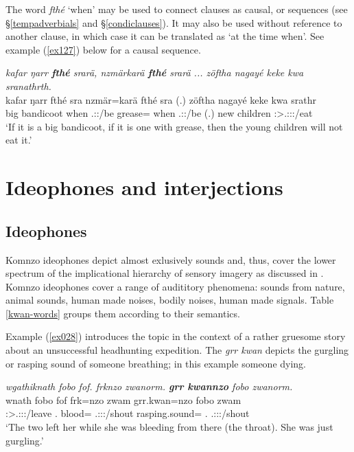 The word \emph{fthé} `when' may be used to connect clauses as causal,  or  sequences (see \S\ref{tempadverbials} and \S\ref{condiclauses}). It may also be used without reference to another clause, in which case it can be translated as `at the time when'. See example (\ref{ex127}) below for a causal sequence.

\begin{exe}
	\ex \emph{kafar ŋarr \textbf{fthé} srarä, nzmärkarä \textbf{fthé} srarä ... zöftha nagayé keke kwa sranathrth.}\\
	\gll kafar ŋarr fthé sra nzmär=karä fthé sra (.) zöftha nagayé keke kwa srathr\\
	big bandicoot when \Tsg.\Masc:\Irr:\Ipfv/be grease=\Prop{} when \Tsg.\Masc:\Irr:\Ipfv/be (.) new children \Neg{} \Fut{} \Stsg:\Sbj>\Tsg.\Masc:\Obj:\Irr:\Ipfv/eat\\
	\trans `If it is a big bandicoot, if it is one with grease, then the young children will not eat it.'
	\label{ex127}
\end{exe}

\section{Ideophones and interjections} \label{ideophones-and-interjections}

\subsection{Ideophones} \label{ideophonesec}

Komnzo ideophones depict almost exlusively sounds and, thus, cover the lower spectrum of the implicational hierarchy of sensory imagery as discussed in \citep[663]{Dingemanse:2012fc}. Komnzo ideophones cover a range of audititory phenomena: sounds from nature, animal sounds, human made noises, bodily noises, human made signals. Table \ref{kwan-words} groups them according to their semantics.%

Example (\ref{ex028}) introduces the topic in the context of a rather gruesome story about an unsuccessful headhunting expedition. The  \emph{grr kwan} depicts the gurgling or rasping sound of someone breathing; in this example someone dying.

\begin{exe}
	\ex \emph{wgathiknath fobo fof. frknzo zwanorm. \textbf{grr kwannzo} fobo zwanorm.}\\
	\gll wnath fobo fof frk=nzo zwam grr.kwan=nzo fobo zwam\\
	\Stdu:\Sbj>\Tsg.\F:\Obj:\Pst:\Ipfv/leave \Dist{}.\All{} \Emph{} blood=\Only{} \Tsg.\F:\Sbj:\Pst:\Dur/shout rasping.sound=\Only{} \Dist{}.\All{} \Tsg.\F:\Sbj:\Pst:\Dur/shout\\
	\trans `The two left her while she was bleeding from there (the throat). She was just gurgling.'
	\label{ex028}
\end{exe}

